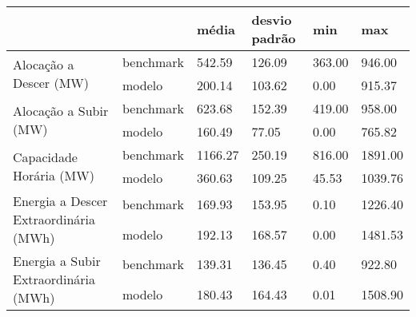 \begin{tabular}{llllll}
\toprule
 &  & média & desvio padrão & min & max \\
\midrule
\multirow[t]{2}{*}{Alocação a Descer (MW)} & benchmark & 542.59 & 126.09 & 363.00 & 946.00 \\
 & modelo & 200.14 & 103.62 & 0.00 & 915.37 \\
\cline{1-6}
\multirow[t]{2}{*}{Alocação a Subir (MW)} & benchmark & 623.68 & 152.39 & 419.00 & 958.00 \\
 & modelo & 160.49 & 77.05 & 0.00 & 765.82 \\
\cline{1-6}
\multirow[t]{2}{*}{Capacidade Horária (MW)} & benchmark & 1166.27 & 250.19 & 816.00 & 1891.00 \\
 & modelo & 360.63 & 109.25 & 45.53 & 1039.76 \\
\cline{1-6}
\multirow[t]{2}{*}{Energia a Descer Extraordinária (MWh)} & benchmark & 169.93 & 153.95 & 0.10 & 1226.40 \\
 & modelo & 192.13 & 168.57 & 0.00 & 1481.53 \\
\cline{1-6}
\multirow[t]{2}{*}{Energia a Subir Extraordinária (MWh)} & benchmark & 139.31 & 136.45 & 0.40 & 922.80 \\
 & modelo & 180.43 & 164.43 & 0.01 & 1508.90 \\
\cline{1-6}
\bottomrule
\end{tabular}
